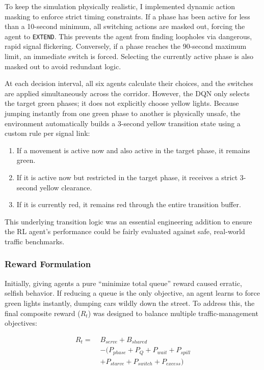 \documentclass[conference]{IEEEtran}
\begin{document}
To keep the simulation physically realistic, I implemented dynamic action masking to enforce strict timing constraints. If a phase has been active for less than a 10-second minimum, all switching actions are masked out, forcing the agent to \texttt{EXTEND}. This prevents the agent from finding loopholes via dangerous, rapid signal flickering. Conversely, if a phase reaches the 90-second maximum limit, an immediate switch is forced. Selecting the currently active phase is also masked out to avoid redundant logic.

At each decision interval, all six agents calculate their choices, and the switches are applied simultaneously across the corridor. However, the DQN only selects the target green phases; it does not explicitly choose yellow lights. Because jumping instantly from one green phase to another is physically unsafe, the environment automatically builds a 3-second yellow transition state using a custom rule per signal link:
\begin{enumerate}
    \item If a movement is active now and also active in the target phase, it remains green.
    \item If it is active now but restricted in the target phase, it receives a strict 3-second yellow clearance.
    \item If it is currently red, it remains red through the entire transition buffer.
\end{enumerate}
This underlying transition logic was an essential engineering addition to ensure the RL agent's performance could be fairly evaluated against safe, real-world traffic benchmarks.

\subsubsection{Reward Formulation}
Initially, giving agents a pure ``minimize total queue'' reward caused erratic, selfish behavior. If reducing a queue is the only objective, an agent learns to force green lights instantly, dumping cars wildly down the street. To address this, the final composite reward ($R_t$) was designed to balance multiple traffic-management objectives:

\begin{equation}
\begin{aligned}
R_t =\;& B_{serve} + B_{shared} \\
&- (P_{phase} + P_Q + P_{wait} + P_{spill} \\
&+ P_{starve} + P_{switch} + P_{excess})
\end{aligned}
\end{equation}
\end{document}
